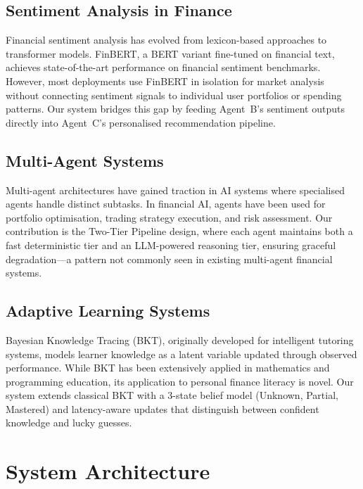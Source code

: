 \documentclass[conference]{IEEEtran}
\begin{document}
\subsection{Sentiment Analysis in Finance}

Financial sentiment analysis has evolved from lexicon-based approaches to transformer models. FinBERT, a BERT variant fine-tuned on financial text, achieves state-of-the-art performance on financial sentiment benchmarks. However, most deployments use FinBERT in isolation for market analysis without connecting sentiment signals to individual user portfolios or spending patterns. Our system bridges this gap by feeding Agent~B's sentiment outputs directly into Agent~C's personalised recommendation pipeline.

\subsection{Multi-Agent Systems}

Multi-agent architectures have gained traction in AI systems where specialised agents handle distinct subtasks. In financial AI, agents have been used for portfolio optimisation, trading strategy execution, and risk assessment. Our contribution is the Two-Tier Pipeline design, where each agent maintains both a fast deterministic tier and an LLM-powered reasoning tier, ensuring graceful degradation---a pattern not commonly seen in existing multi-agent financial systems.

\subsection{Adaptive Learning Systems}

Bayesian Knowledge Tracing (BKT), originally developed for intelligent tutoring systems, models learner knowledge as a latent variable updated through observed performance. While BKT has been extensively applied in mathematics and programming education, its application to personal finance literacy is novel. Our system extends classical BKT with a 3-state belief model (Unknown, Partial, Mastered) and latency-aware updates that distinguish between confident knowledge and lucky guesses.

\section{System Architecture}
\end{document}
